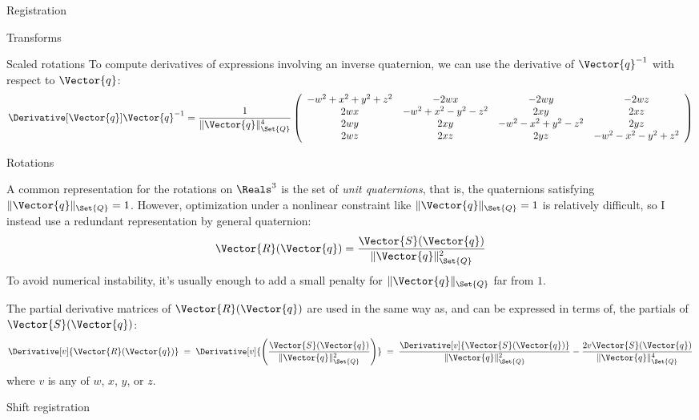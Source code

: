\begin{plSection}{Registration}
\begin{plSection}{Transforms}
\begin{plSection}{Scaled rotations}
To compute derivatives of expressions
involving an inverse quaternion,
we can use the derivative of $\Vector{q}^{-1}$
with respect to $\Vector{q}$:
\begin{equation}
\Derivative[\Vector{q}]{\Vector{q}^{-1}}
=
{1 \over {\| \Vector{q} \|_{\Set{Q}}^4}}
\left(
\begin{array}{cccc}
-w^2+x^2+y^2+z^2 & -2wx              & -2wy              & -2wz \\
 2wx             & -w^2+x^2-y^2-z^2  &  2xy              &  2xz \\
 2wy             &   2xy             & -w^2-x^2+y^2-z^2  &  2yz \\
 2wz             &   2xz             &  2yz              &  -w^2-x^2-y^2+z^2 \\
\end{array}
\right)
\end{equation}

\end{plSection}%
\begin{plSection}{Rotations}
\label{sec:Rotations}

A common representation for the rotations on $\Reals^3$
is the set of {\it unit quaternions},
that is, the quaternions satisfying $\| \Vector{q} \|_{\Set{Q}} = 1$.
However, optimization under a nonlinear constraint
like $\| \Vector{q} \|_{\Set{Q}} = 1$ is relatively difficult,
so I instead use a redundant representation by general quaternion:
\begin{equation}
\Vector{R}(\Vector{q}) = {{\Vector{S}(\Vector{q})} \over {\| \Vector{q} \|_{\Set{Q}}^2}}
\end{equation}
To avoid numerical instability, it's usually enough
to add a small penalty for $\| \Vector{q} \|_{\Set{Q}}$ far from $1$.

The partial derivative matrices of $\Vector{R}(\Vector{q})$ are used in the
same way as,
and can be expressed in terms of,
the partials of $\Vector{S}(\Vector{q})$:
\begin{equation}
\Derivative[v]{\Vector{R}(\Vector{q})}
\; = \;
\Derivative[v]
{\left(
{{\Vector{S}(\Vector{q})} \over {\| \Vector{q} \|_{\Set{Q}}^2}}
\right)}
\; = \;
{{\Derivative[v]{\Vector{S}(\Vector{q})}} \over {\| \Vector{q} \|_{\Set{Q}}^2}}
-
{{2v \Vector{S}(\Vector{q})} \over {\| \Vector{q} \|_{\Set{Q}}^4}}
\end{equation}
where $v$ is any of $w$, $x$, $y$, or $z$.

\end{plSection}%
\begin{plSection}{Shift registration}
\label{sec:Shift-registration}


\end{plSection}
\end{plSection}
\end{plSection}
